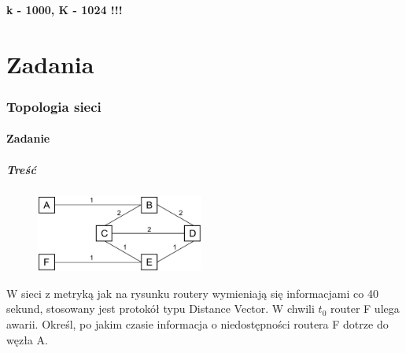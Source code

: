 
\newpage
\begin{center}
	{\LARGE \textbf{k - 1000, K - 1024 !!!}}
\end{center}

\part{Zadania}
\section{Topologia sieci}
	\subsection{Zadanie}
		\subsubsection{Treść}
			\begin{figure}
				\includegraphics[width=5.5cm]{./images/zadanie02.pdf}
			\end{figure} 
			W sieci z metryką jak na rysunku routery wymieniają się informacjami co 40 sekund, stosowany jest protokół typu Distance Vector. W chwili $ t_0 $ router F ulega awarii. Określ, po jakim czasie informacja o niedostępności routera F dotrze do węzła A.\\\\\\\\
